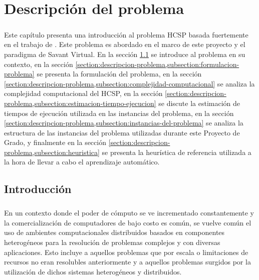 \chapter{Descripción del problema} \label{section-descripcion-problema}

\paragraph{}Este capítulo presenta una introducción al problema HCSP basada fuertemente en el trabajo de \citet{bib-doctorado-nesmachnow}. Este problema es abordado en el marco de este proyecto y el paradigma de Savant Virtual. En la sección \ref{section:descripcion-problema,subsection:introduccion} se introduce al problema en su contexto, en la sección \ref{section:descripcion-problema,subsection:formulacion-problema} se presenta la formulación del problema, en la sección \ref{section:descripcion-problema,subsection:complejidad-computacional} se analiza la complejidad computacional del HCSP, en la sección \ref{section:descripcion-problema,subsection:estimacion-tiempo-ejecucion} se discute la estimación de tiempos de ejecución utilizada en las instancias del problema, en la sección \ref{section:descripcion-problema,subsection:instancias-del-problema} se analiza la estructura de las instancias del problema utilizadas durante este Proyecto de Grado, y finalmente en la sección \ref{section:descripcion-problema,subsection:heuristica} se
presenta la heurística de referencia utilizada a la hora de llevar a cabo el aprendizaje automático.

\section{Introducción} \label{section:descripcion-problema,subsection:introduccion}

 
\paragraph{}En un contexto donde el poder de cómputo se ve incrementado constantemente y la comercialización de computadores de bajo costo es común, se vuelve común el uso de ambientes computacionales distribuidos basados en componentes heterogéneos para la resolución de problemas complejos y con diversas aplicaciones. Esto incluye a aquellos problemas que por escala o limitaciones de recursos no eran resolubles anteriormente y a aquellos problemas surgidos por la utilización de dichos sistemas heterogéneos y distribuidos. 

